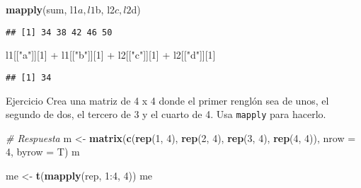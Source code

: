 \documentclass[]{article}
\newenvironment{Shaded}{\begin{snugshade}}{\end{snugshade}}
\newcommand{\KeywordTok}[1]{\textcolor[rgb]{0.13,0.29,0.53}{\textbf{{#1}}}}
\newcommand{\DataTypeTok}[1]{\textcolor[rgb]{0.13,0.29,0.53}{{#1}}}
\newcommand{\DecValTok}[1]{\textcolor[rgb]{0.00,0.00,0.81}{{#1}}}
\newcommand{\StringTok}[1]{\textcolor[rgb]{0.31,0.60,0.02}{{#1}}}
\newcommand{\CommentTok}[1]{\textcolor[rgb]{0.56,0.35,0.01}{\textit{{#1}}}}
\newcommand{\NormalTok}[1]{{#1}}
\begin{document}
\begin{Shaded}
\begin{Highlighting}[]
\KeywordTok{mapply}\NormalTok{(sum, l1$a, l1$b, l2$c, l2$d)}
\end{Highlighting}
\end{Shaded}

\begin{verbatim}
## [1] 34 38 42 46 50
\end{verbatim}

\begin{Shaded}
\begin{Highlighting}[]
\NormalTok{l1[[}\StringTok{"a"}\NormalTok{]][}\DecValTok{1}\NormalTok{] +}\StringTok{ }\NormalTok{l1[[}\StringTok{"b"}\NormalTok{]][}\DecValTok{1}\NormalTok{] +}\StringTok{ }\NormalTok{l2[[}\StringTok{"c"}\NormalTok{]][}\DecValTok{1}\NormalTok{] +}\StringTok{ }\NormalTok{l2[[}\StringTok{"d"}\NormalTok{]][}\DecValTok{1}\NormalTok{]}
\end{Highlighting}
\end{Shaded}

\begin{verbatim}
## [1] 34
\end{verbatim}

\renewcommand\bcStyleTitre[1]{\large\textcolor{bbblack}{#1}}

\begin{bclogo}[
  couleur=llred,
  arrondi=0,
  logo=\bcstop,
  barre=none,
  noborder=true]{Ejercicio}
Crea una matriz de 4 x 4 donde el primer renglón sea de unos, el segundo de dos,
el tercero de 3 y el cuarto de 4. Usa \texttt{mapply} para hacerlo.
\end{bclogo}

\begin{Shaded}
\begin{Highlighting}[]
\CommentTok{# Respuesta}
\NormalTok{m <-}\StringTok{ }\KeywordTok{matrix}\NormalTok{(}\KeywordTok{c}\NormalTok{(}\KeywordTok{rep}\NormalTok{(}\DecValTok{1}\NormalTok{, }\DecValTok{4}\NormalTok{), }\KeywordTok{rep}\NormalTok{(}\DecValTok{2}\NormalTok{, }\DecValTok{4}\NormalTok{), }\KeywordTok{rep}\NormalTok{(}\DecValTok{3}\NormalTok{, }\DecValTok{4}\NormalTok{), }\KeywordTok{rep}\NormalTok{(}\DecValTok{4}\NormalTok{, }\DecValTok{4}\NormalTok{)), }\DataTypeTok{nrow =} \DecValTok{4}\NormalTok{, }\DataTypeTok{byrow =} \NormalTok{T)}
\NormalTok{m}

\NormalTok{me <-}\StringTok{ }\KeywordTok{t}\NormalTok{(}\KeywordTok{mapply}\NormalTok{(rep, }\DecValTok{1}\NormalTok{:}\DecValTok{4}\NormalTok{, }\DecValTok{4}\NormalTok{))}
\NormalTok{me}
\end{Highlighting}
\end{Shaded}
\end{document}
